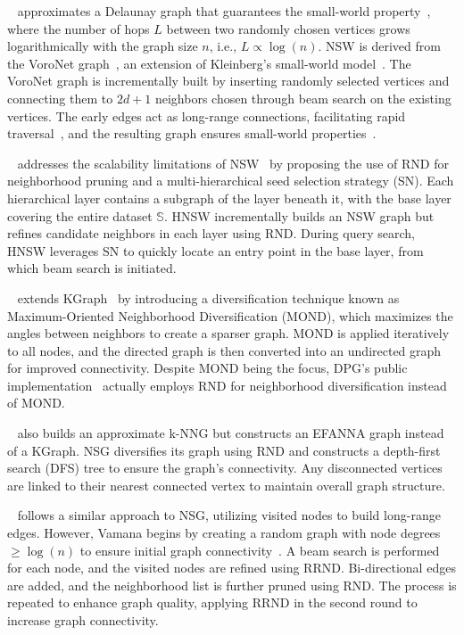 ~\cite{nsw11,nsw14} approximates a Delaunay graph that guarantees the small-world property~\cite{watts98}, where the number of hops \(L\) between two randomly chosen vertices grows logarithmically with the graph size \(n\), i.e., \(L \propto \log(n)\). NSW is derived from the VoroNet graph~\cite{voronet}, an extension of Kleinberg's small-world model~\cite{kleinberg2000,kleinberg2002}. The VoroNet graph is incrementally built by inserting randomly selected vertices and connecting them to \(2d+1\) neighbors chosen through beam search on the existing vertices. The early edges act as long-range connections, facilitating rapid traversal~\cite{voronet}, and the resulting graph ensures small-world properties~\cite{voronet,beaumont07}.

~\cite{hnsw} addresses the scalability limitations of NSW~\cite{nsw11,nsw14} by proposing the use of RND for neighborhood pruning and a multi-hierarchical seed selection strategy (SN). Each hierarchical layer contains a subgraph of the layer beneath it, with the base layer covering the entire dataset \( \mathbb{S} \). HNSW incrementally builds an NSW graph but refines candidate neighbors in each layer using RND. During query search, HNSW leverages SN to quickly locate an entry point in the base layer, from which beam search is initiated.

~\cite{dpg} extends KGraph~\cite{kgraph} by introducing a diversification technique known as Maximum-Oriented Neighborhood Diversification (MOND), which maximizes the angles between neighbors to create a sparser graph. MOND is applied iteratively to all nodes, and the directed graph is then converted into an undirected graph for improved connectivity. Despite MOND being the focus, DPG's public implementation~\cite{dpgrepo} actually employs RND for neighborhood diversification instead of MOND.

~\cite{nsg} also builds an approximate k-NNG but constructs an EFANNA graph instead of a KGraph. NSG diversifies its graph using RND and constructs a depth-first search (DFS) tree to ensure the graph's connectivity. Any disconnected vertices are linked to their nearest connected vertex to maintain overall graph structure.

~\cite{vamana} follows a similar approach to NSG, utilizing visited nodes to build long-range edges. However, Vamana begins by creating a random graph with node degrees \( \geq \log(n) \) to ensure initial graph connectivity~\cite{erconnect}. A beam search is performed for each node, and the visited nodes are refined using RRND. Bi-directional edges are added, and the neighborhood list is further pruned using RND. The process is repeated to enhance graph quality, applying RRND in the second round to increase graph connectivity.

